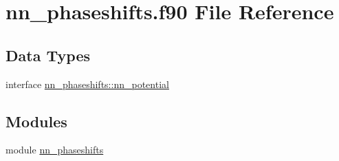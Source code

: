 \hypertarget{nn__phaseshifts_8f90}{}\section{nn\+\_\+phaseshifts.\+f90 File Reference}
\label{nn__phaseshifts_8f90}
\subsection*{Data Types}
\begin{DoxyCompactItemize}
\item 
interface \hyperlink{interfacenn__phaseshifts_1_1nn__potential}{nn\+\_\+phaseshifts\+::nn\+\_\+potential}
\end{DoxyCompactItemize}
\subsection*{Modules}
\begin{DoxyCompactItemize}
\item 
module \hyperlink{namespacenn__phaseshifts}{nn\+\_\+phaseshifts}
\end{DoxyCompactItemize}
